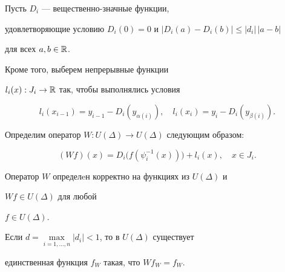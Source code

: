 Пусть $D_i$ --- вещественно-значные функции,


удовлетворяющие условию $D_i(0)=0$ и $ |D_i(a)-D_i(b)| \le |d_i|\,|a-b|$


для всех $a,b \in {\Bbb R}$.


Кроме того, выберем непрерывные функции


$l_i(x):J_i \to {\Bbb R}$ так, чтобы выполнялись условия


$$


l_i(x_{i-1}) = y_{i-1} - D_i (y_{\alpha(i)}),\quad


l_i(x_{i}) = y_{i} - D_i (y_{\beta (i)}).


$$


Определим оператор $W: U (\Delta) \to U (\Delta)$ следующим образом:


\begin{equation} \label{def}


(W f)(x) = D_i \big(f\left (\psi_i^{-1} (x) \right) \big)


+ l_i(x), \quad x \in J_i.


\end{equation}





\begin{thm}


Оператор $W$ определeн корректно на функциях из $U (\Delta)$ и


$W f \in U (\Delta)$ для любой


$ f \in U (\Delta)$.


Если $d =\max\limits_{i=1,\dotsc,n} |d_i|<1$, то в $U (\Delta)$ существует


единственная функция $f_W$ такая, что $W f_W = f_W$.


\end{thm}





